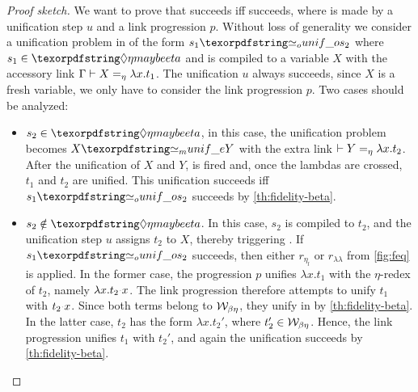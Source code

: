 \begin{proof}[Proof sketch] %
  We want to prove that \fstep succeeds iff \hstep
  succeeds, where \hstep is made by a unification step $u$ and a link
  progression $p$.
  Without loss of generality we consider a
  unification problem in \Fo{} of the form $s_1 \Uo s_2$
  where $s_1 \in \maybeeta$ and is compiled to a variable $X$ with the accessory link
  $\Gamma \vdash X =_\eta \lambda x.t_1$. 
  The unification $u$ always succeeds, since $X$ is a fresh variable, we 
  only have to consider the link progression $p$.
  Two cases should be analyzed:
  \begin{itemize}
    \item $s_2 \in \maybeeta$, in this case, the unification problem becomes $X \Ue Y$ 
          with the extra link $ \vdash Y =_\eta \lambda x.t_2$. After the unification of 
          $X$ and $Y$, \progressetadedup is fired and, once the lambdas are crossed,
          $t_1$ and $t_2$ are unified. 
          This unification succeeds iff $s_1 \Uo s_2$ succeeds by \cref{th:fidelity-beta}.


    \item $s_2 \notin \maybeeta$. In this case, $s_2$ is compiled to $t_2$, and
    the unification step $u$ assigns $t_2$ to $X$, thereby triggering
    \progressetaleft. If $s_1 \Uo s_2$ succeeds, then either $r_{\eta_l}$ or
    $r_{\lambda\lambda}$ from \cref{fig:feq} is applied. In the former case, the
    progression $p$ unifies $\lambda x.t_1$ with the $\eta$-redex of $t_2$,
    namely $\lambda x.t_2\appsep x$. The link progression therefore attempts to
    unify $t_1$ with $t_2\appsep x$. Since both terms belong to $\mathcal{W}_{\beta
    \eta}$, they unify in \Ho by \cref{th:fidelity-beta}. In the latter case,
    $t_2$ has the form $\lambda x.t_2'$, where $t_2' \in \mathcal{W}_{\beta \eta}$.
    Hence, the link progression unifies $t_1$ with $t_2'$, and again the
    unification succeeds by \cref{th:fidelity-beta}.


\end{itemize}
\end{proof}
